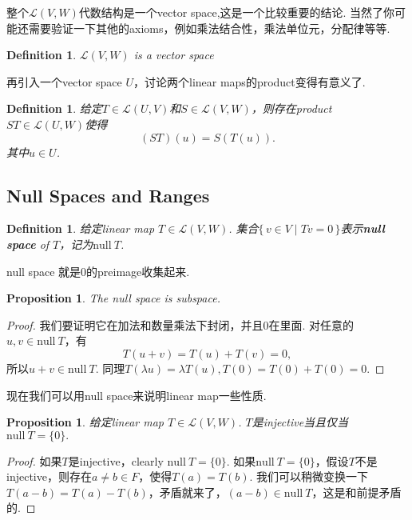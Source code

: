 \documentclass{article}
\newtheorem{proposition}[theorem]{Proposition}
\newtheorem{definition}[theorem]{Definition}
\newcommand\Set[2]{\{\,#1\mid#2\,\}} %
\newcommand\nul[1]{\text{null}\ #1}
\begin{document}
{\color{red} 整个$\mathcal{L}(V,W)$代数结构是一个vector space,这是一个比较重要的结论}. 当然了你可能还需要验证一下其他的axioms，例如乘法结合性，乘法单位元，分配律等等.

\begin{definition}
\rm $\mathcal{L}(V,W)$ is a vector space
\end{definition}

{\color{red} 再引入一个vector space $U$，讨论两个linear maps的product变得有意义了}.

\begin{definition}
\rm 给定$T \in \mathcal{L}(U,V)$和$S \in \mathcal{L}(V,W)$，则存在product $ST \in \mathcal{L}(U,W)$使得
$$
	(ST)(u) = S(T(u)).
$$
其中$u \in U$. 
\end{definition}

\newpage
\subsection{Null Spaces and Ranges}

\begin{definition}
\rm 给定linear map $T \in \mathcal{L}(V,W)$. 集合$\Set{v \in V}{Tv = 0}$表示\textbf{null space} of $T$，记为$\nul{T}$.
\end{definition}

{\color{red} null space 就是0的preimage收集起来}.

\begin{proposition}
\rm The null space is subspace.
\end{proposition}

\begin{proof}
我们要证明它在加法和数量乘法下封闭，并且$0$在里面. 对任意的$u,v \in \nul{T}$，有\[T(u+v) = T(u) + T(v) = 0,\]所以$u+v \in \nul{T}$. 同理$T(\lambda u) = \lambda T(u), T(0)=T(0)+T(0)=0$.
\end{proof}

{\color{red} 现在我们可以用null space来说明linear map一些性质}.

\begin{proposition}
\rm 给定linear map $T \in \mathcal{L}(V,W)$. $T$是injective当且仅当$\nul{T}=\{0\}.$
\end{proposition}

\begin{proof}
如果$T$是injective，clearly $\nul{T}=\{0\}$. 如果$\nul{T}=\{0\}$，假设$T$不是injective，则存在$a \neq b \in F$，使得$T(a) = T(b)$. 我们可以稍微变换一下$T(a-b) = T(a) - T(b)$，矛盾就来了，$(a - b) \in \nul{T}$，这是和前提矛盾的.
\end{proof}
\end{document}
